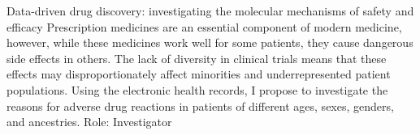 \documentclass{nihbiosketch}
\begin{document}
          
      {Data-driven drug discovery: investigating the molecular
mechanisms of safety and efficacy}
      {Prescription medicines are an essential component of modern
medicine, however, while these medicines work well for some patients,
they cause dangerous side effects in others. The lack of diversity in
clinical trials means that these effects may disproportionately affect
minorities and underrepresented patient populations. Using the
electronic health records, I propose to investigate the reasons for
adverse drug reactions in patients of different ages, sexes, genders,
and ancestries.}
      {Role: Investigator}
      
      \bigskip
      
  
\end{document}
